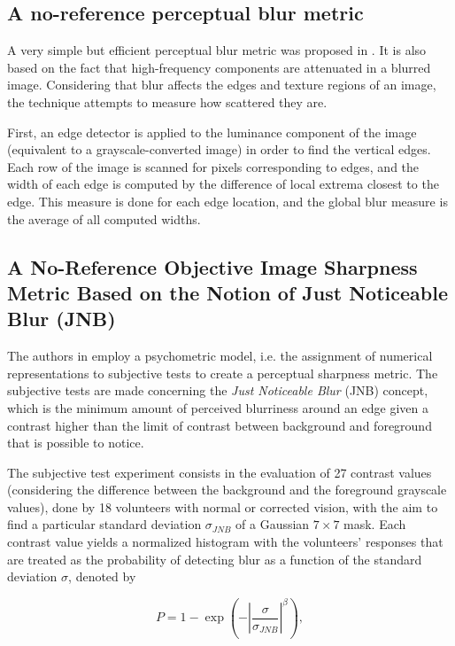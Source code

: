 \subsection{A no-reference perceptual blur metric}

A very simple but efficient perceptual blur metric was proposed in
\cite{marziliano2002noreference}. It is also based on the fact that high-frequency components are attenuated in a blurred image. Considering that blur affects the edges and texture regions of an image, the technique attempts to measure how scattered they are. 

First, an edge detector is applied to the luminance component of the image (equivalent to a grayscale-converted image) in order to find the vertical edges. Each row of the image is scanned for pixels corresponding to edges, and the width of each edge is computed by the difference of local extrema closest to the edge. This measure is done for each edge location, and the global blur measure is the average of all computed widths.

\subsection{A No-Reference Objective Image Sharpness Metric Based on the Notion of Just Noticeable Blur (JNB)}
\label{subsec:jnb_approach}

The authors in \cite{ferzli2009noreference} employ a psychometric model, i.e. the assignment of numerical representations to subjective tests to create a perceptual sharpness metric. The subjective tests are made concerning the \emph{Just Noticeable Blur} (JNB) concept, which is the minimum amount of perceived blurriness around an edge given a contrast higher than the limit of contrast between background and foreground that is possible to notice. 

The subjective test experiment consists in the evaluation of 27 contrast values (considering the difference between the background and the foreground grayscale values), done by 18 volunteers with normal or corrected vision, with the aim to find a particular standard deviation $\sigma_{JNB}$ of a Gaussian $7 \times 7$ mask. Each contrast value yields a normalized histogram with the volunteers' responses that are treated as the probability of detecting blur as a function of the standard deviation $\sigma$, denoted by

\begin{equation}
\label{eqn:psychometric_jnb}
P = 1 - \exp{\left( - \left| \frac{\sigma}{\sigma_{JNB} } \right|^{\beta} \right)},
\end{equation}

